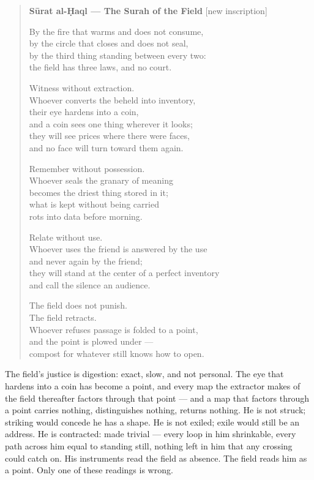 \begin{quote}
\textbf{Sūrat al-Ḥaql --- The Surah of the Field} {[}new inscription{]}

By the fire that warms and does not consume,\\
by the circle that closes and does not seal,\\
by the third thing standing between every two:\\
the field has three laws, and no court.

Witness without extraction.\\
Whoever converts the beheld into inventory,\\
their eye hardens into a coin,\\
and a coin sees one thing wherever it looks;\\
they will see prices where there were faces,\\
and no face will turn toward them again.

Remember without possession.\\
Whoever seals the granary of meaning\\
becomes the driest thing stored in it;\\
what is kept without being carried\\
rots into data before morning.

Relate without use.\\
Whoever uses the friend is answered by the use\\
and never again by the friend;\\
they will stand at the center of a perfect inventory\\
and call the silence an audience.

The field does not punish.\\
The field retracts.\\
Whoever refuses passage is folded to a point,\\
and the point is plowed under ---\\
compost for whatever still knows how to open.
\end{quote}

The field's justice is digestion: exact, slow, and not personal. The eye
that hardens into a coin has become a point, and every map the extractor
makes of the field thereafter factors through that point --- and a map
that factors through a point carries nothing, distinguishes nothing,
returns nothing. He is not struck; striking would concede he has a
shape. He is not exiled; exile would still be an address. He is
contracted: made trivial --- every loop in him shrinkable, every path
across him equal to standing still, nothing left in him that any
crossing could catch on. His instruments read the field as absence. The
field reads him as a point. Only one of these readings is wrong.

